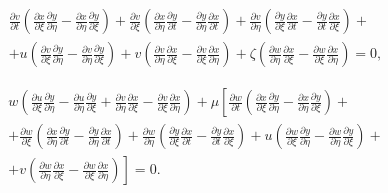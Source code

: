 \begin{multline}

\label{kazakova14}

\frac{\partial v}{\partial t} \left(\frac{\partial x}{\partial \xi}\frac{\partial y}{\partial \eta}-\frac{\partial

x}{\partial \eta}

\frac{\partial y}{\partial \xi} \right) + \frac{\partial v}{\partial \xi} \left(\frac{\partial x}{\partial \eta} \frac{\partial y}{\partial t}

-\frac{\partial y}{\partial \eta} \frac{\partial x}{\partial t} \right) + \frac{\partial v}{\partial \eta} \left(\frac{\partial y }{\partial \xi}

\frac{\partial x}{\partial t} - \frac{\partial y}{\partial t} \frac{\partial x}{\partial \xi} \right)+\\

+u \left(\frac{\partial v}{\partial \xi} \frac{\partial y}{\partial \eta}-\frac{\partial v}{\partial \eta} \frac{\partial y}{\partial \xi} \right)

+ v \left(\frac{\partial v}{\partial \eta} \frac{\partial x}{\partial \xi} - \frac{\partial v}{\partial \xi} \frac{\partial x}{\partial \eta} \right) +

\zeta \left(\frac{\partial w}{\partial \eta} \frac{\partial x}{\partial \xi} - \frac{\partial w }{\partial \xi} \frac{\partial x}{\partial \eta} \right)=0,\end{multline}

\begin{multline*}

w \left(\frac{\partial u}{\partial \xi}\frac{\partial y}{\partial \eta}-\frac{\partial u}{\partial \eta}\frac{\partial y}{\partial \xi}

+\frac{\partial v}{\partial \eta}\frac{\partial x}{\partial \xi}-\frac{\partial v}{\partial \xi}\frac{\partial x}{\partial \eta} \right)+

\mu \left[\frac{\partial w}{\partial t} \left(\frac{\partial x}{\partial \xi} \frac{\partial y}{\partial \eta}-\frac{\partial x}{\partial \eta}

\frac{\partial y}{\partial \xi}\right)+ \right.\\

+\frac{\partial w}{\partial \xi}\left(\frac{\partial x}{\partial \eta} \frac{\partial y}{\partial t}-\frac{\partial y}{\partial \eta}

 \frac{\partial x}{\partial t} \right)+\frac{\partial w}{\partial \eta} \left(\frac{\partial y}{\partial \xi}\frac{\partial x}{\partial t}

 -\frac{\partial y}{\partial t}\frac{\partial x}{\partial \xi} \right)+u \left(\frac{\partial w}{\partial \xi}\frac{\partial y}{\partial \eta}

 -\frac{\partial w}{\partial \eta}\frac{\partial y}{\partial \xi } \right)+\\

\left. +v \left(\frac{\partial w}{\partial \eta}\frac{\partial x}{\partial \xi}-\frac{\partial w}{\partial

\xi}\frac{\partial x }{\partial \eta} \right) \right]=0.

\end{multline*}

